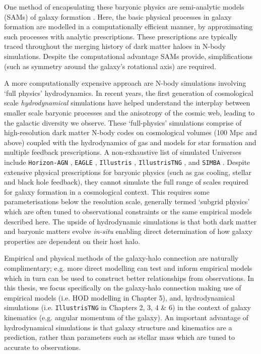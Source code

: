 One method of encapsulating these baryonic physics are semi-analytic models (SAMs) of galaxy formation \citep[e.g.][]{white1991, kauffmann1993, somerville1999}. Here, the basic physical processes in galaxy formation are modelled in a computationally efficient manner, by approximating such processes with analytic prescriptions. These prescriptions are typically traced throughout the merging history of dark matter haloes in N-body simulations. Despite the computational advantage SAMs provide, simplifications (such as symmetry around the galaxy's rotational axis) are required. 

A more computationally expensive approach are N-body simulations involving `full physics' hydrodynamics. In recent years, the first generation of cosmological scale \textit{hydrodynamical} simulations have helped understand the interplay between smaller scale baryonic processes and the anisotropy of the cosmic web, leading to the galactic diversity we observe. These `full-physics' simulations comprise of high-resolution dark matter N-body codes on cosmological volumes (100 Mpc and above) coupled with the hydrodynamics of gas and models for star formation and multiple feedback prescriptions. A non-exhaustive list of simulated Universes include \texttt{Horizon-AGN} \citep{dubois2014}, \texttt{EAGLE} \citep{schaye2015}, \texttt{Illustris} \citep{vogelsberger2014a, vogelsberger2014b, genel2014, sijacki2015}, \texttt{IllustrisTNG} \citep{marinacci18, naiman18, nelson18, pillepich18a, springel18}, and \texttt{SIMBA} \citep{dave2019}. Despite extensive physical prescriptions for baryonic physics (such as gas cooling, stellar and black hole feedback), they cannot simulate the full range of scales required for galaxy formation in a cosmological context. This requires some parameterisations below the resolution scale, generally termed `subgrid physics' which are often tuned to observational constraints or the same empirical models described here. The upside of hydrodynamic simulations is that both dark matter and baryonic matters evolve \textit{in-situ} enabling direct determination of how galaxy properties are dependent on their host halo. 

Empirical and physical methods of the galaxy-halo connection are naturally complimentary; e.g. more direct modelling can test and inform empirical models which in turn can be used to construct better relationships from observations. In this thesis, we focus specifically on the galaxy-halo connection making use of empirical models (i.e. HOD modelling in Chapter 5), and, hydrodynamical simulations (i.e. \texttt{IllustrisTNG} in Chapters 2, 3, 4 \& 6) in the context of galaxy kinematics (e.g. angular momentum of the galaxy). An important advantage of hydrodynamical simulations is that galaxy structure and kinematics are a prediction, rather than parameters such as stellar mass which are tuned to accurate to observations. 

